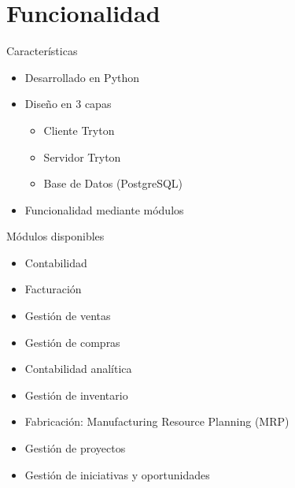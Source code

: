 
\section{Funcionalidad}

    \begin{frame}{Características}
    	\begin{itemize}
    		\item Desarrollado en Python
    		\item Diseño en 3 capas
    			\begin{itemize}
    				\item Cliente Tryton
    				\item Servidor Tryton
    				\item Base de Datos (PostgreSQL)
    			\end{itemize}
    		\item Funcionalidad mediante módulos
    	\end{itemize}
    \end{frame}

    \begin{frame}{Módulos disponibles}
		\begin{itemize}
		    \item Contabilidad
		    \item Facturación
		    \item Gestión de ventas
		    \item Gestión de compras
		    \item Contabilidad analítica
		    \item Gestión de inventario
		    \item Fabricación: Manufacturing Resource Planning (MRP)
		    \item Gestión de proyectos
		    \item Gestión de iniciativas y oportunidades
		\end{itemize}
	\end{frame}